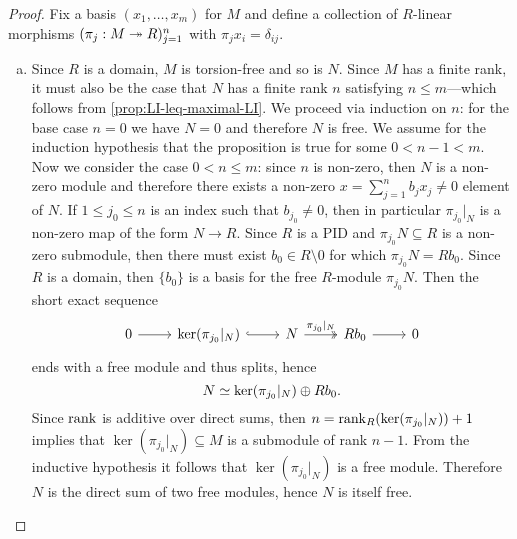\begin{proof}
    Fix a basis \((x_1, \dots, x_m)\) for \(M\) and define a collection of
    \(R\)-linear morphisms \((\pi_j: M \twoheadrightarrow R)_{j=1}^n\) with
    \(\pi_j x_i = \delta_{i j}\).
    \begin{enumerate}[(a)]\setlength\itemsep{0em}
        \item Since \(R\) is a domain, \(M\) is torsion-free and so is \(N\). Since
              \(M\) has a finite rank, it must also be the case that \(N\) has a finite rank
              \(n\) satisfying \(n \leq m\)---which follows from
              \cref{prop:LI-leq-maximal-LI}. We proceed via induction on \(n\): for the base
              case \(n = 0\) we have \(N = 0\) and therefore \(N\) is free. We assume for
              the induction hypothesis that the proposition is true for some
              \(0 < n-1 < m\). Now we consider the case \(0 < n \leq m\): since \(n\) is
              non-zero, then \(N\) is a non-zero module and therefore there exists a
              non-zero \(x = \sum_{j=1}^n b_j x_j \neq 0\) element of \(N\). If
              \(1 \leq j_0 \leq n\) is an index such that \(b_{j_0} \neq 0\), then in
              particular \(\pi_{j_0}|_N\) is a non-zero map of the form \(N \to R\). Since
              \(R\) is a PID and \(\pi_{j_0} N \subseteq R\) is a non-zero submodule, then
              there must exist \(b_0 \in R \setminus 0\) for which \(\pi_{j_0} N = R
              b_0\). Since \(R\) is a domain, then \(\{b_0\}\) is a basis for the free
              \(R\)-module \(\pi_{j_0} N\). Then the short exact sequence
              \[
                  \begin{tikzcd}
                      0 \ar[r]
                      &\ker(\pi_{j_0}|_N) \ar[r, hook]
                      &N \ar[r, two heads, "\pi_{j_0}|_N"]
                      &R b_0 \ar[r]
                      &0
                  \end{tikzcd}
              \]
              ends with a free module and thus splits, hence
              \[
                  N \simeq \ker(\pi_{j_0}|_N) \oplus R b_0.
              \]
              Since \(\operatorname{rank}\) is additive over direct sums, then
              \(n = \operatorname{rank}_R(\ker(\pi_{j_0}|_N)) + 1\) implies that
              \(\ker(\pi_{j_0}|_N) \subseteq M\) is a submodule of rank \(n-1\). From the
              inductive hypothesis it follows that \(\ker(\pi_{j_0}|_N)\) is a free
              module. Therefore \(N\) is the direct sum of two free modules, hence \(N\) is
              itself free.


\end{enumerate}
\end{proof}
